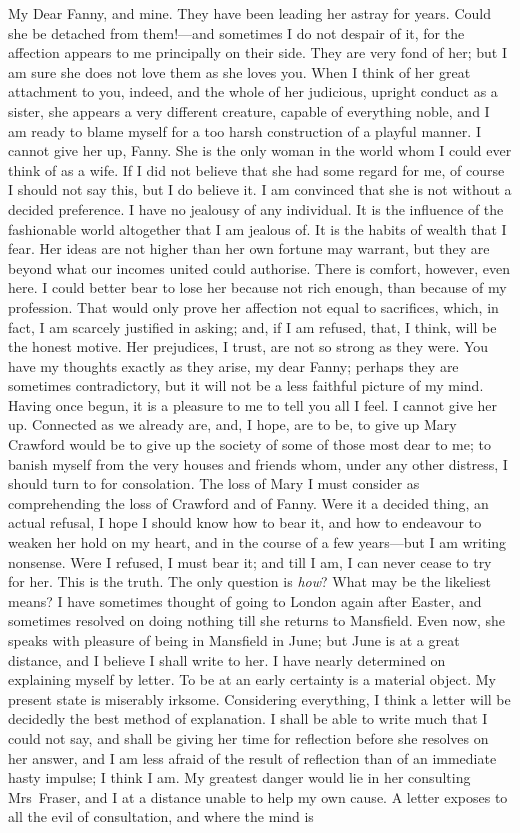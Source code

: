 \begin{mail}{}{My Dear Fanny,}
and mine. They have been leading her astray for years. Could she be detached from them!—and sometimes I do not despair of it, for the affection appears to me principally on their side. They are very fond of her; but I am sure she does not love them as she loves you. When I think of her great attachment to you, indeed, and the whole of her judicious, upright conduct as a sister, she appears a very different creature, capable of everything noble, and I am ready to blame myself for a too harsh construction of a playful manner. I cannot give her up, Fanny. She is the only woman in the world whom I could ever think of as a wife. If I did not believe that she had some regard for me, of course I should not say this, but I do believe it. I am convinced that she is not without a decided preference. I have no jealousy of any individual. It is the influence of the fashionable world altogether that I am jealous of. It is the habits of wealth that I fear. Her ideas are not higher than her own fortune may warrant, but they are beyond what our incomes united could authorise. There is comfort, however, even here. I could better bear to lose her because not rich enough, than because of my profession. That would only prove her affection not equal to sacrifices, which, in fact, I am scarcely justified in asking; and, if I am refused, that, I think, will be the honest motive. Her prejudices, I trust, are not so strong as they were. You have my thoughts exactly as they arise, my dear Fanny; perhaps they are sometimes contradictory, but it will not be a less faithful picture of my mind. Having once begun, it is a pleasure to me to tell you all I feel. I cannot give her up. Connected as we already are, and, I hope, are to be, to give up Mary Crawford would be to give up the society of some of those most dear to me; to banish myself from the very houses and friends whom, under any other distress, I should turn to for consolation. The loss of Mary I must consider as comprehending the loss of Crawford and of Fanny. Were it a decided thing, an actual refusal, I hope I should know how to bear it, and how to endeavour to weaken her hold on my heart, and in the course of a few years—but I am writing nonsense. Were I refused, I must bear it; and till I am, I can never cease to try for her. This is the truth. The only question is \textit{how}? What may be the likeliest means? I have sometimes thought of going to London again after Easter, and sometimes resolved on doing nothing till she returns to Mansfield. Even now, she speaks with pleasure of being in Mansfield in June; but June is at a great distance, and I believe I shall write to her. I have nearly determined on explaining myself by letter. To be at an early certainty is a material object. My present state is miserably irksome. Considering everything, I think a letter will be decidedly the best method of explanation. I shall be able to write much that I could not say, and shall be giving her time for reflection before she resolves on her answer, and I am less afraid of the result of reflection than of an immediate hasty impulse; I think I am. My greatest danger would lie in her consulting Mrs~Fraser, and I at a distance unable to help my own cause. A letter exposes to all the evil of consultation, and where the mind is 
\end{mail}
